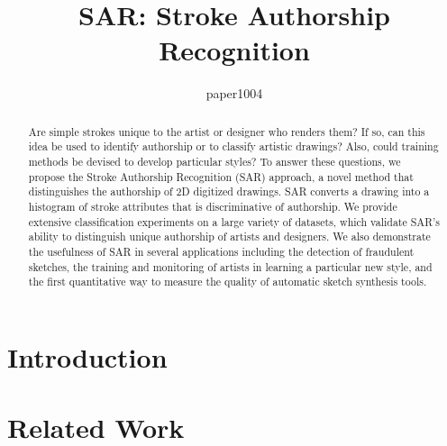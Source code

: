 \documentclass{egpubl}
\title[SAR: Stroke Authorship Recognition]%
      {SAR: Stroke Authorship Recognition}
\author[paper1004]
     {paper1004}
\begin{document}

\maketitle

\begin{abstract}
Are simple strokes unique to the artist or designer who renders them? If so, can this idea be used to identify authorship or to classify artistic drawings? Also, could training methods be devised to develop particular styles? To answer these questions, we propose the Stroke Authorship Recognition (SAR) approach, a novel method that distinguishes the authorship of 2D digitized drawings. SAR converts a drawing into a histogram of stroke attributes that is discriminative of authorship. We provide extensive classification experiments on a large variety of datasets, which validate SAR's ability to distinguish unique authorship of artists and designers. We also demonstrate the usefulness of SAR in several applications including the detection of  fraudulent sketches, the training and monitoring of artists in learning a particular new style, and the first quantitative way to measure the quality of automatic sketch synthesis tools.\vspace{-1mm}
\end{abstract}
\vspace{-5mm}
\section{Introduction}
\vspace{-2mm}


\vspace{-3mm}
\section{Related Work}
\vspace{-2mm}

\end{document}
